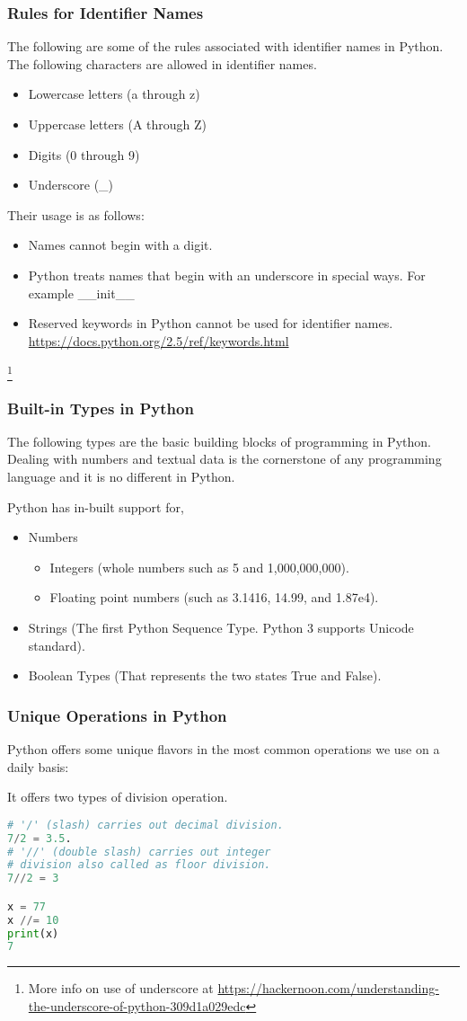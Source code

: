 \documentclass{beamer}
\begin{document}
\begin{frame}[fragile]
\frametitle{Rules for Identifier Names}
The following are some of the rules associated with identifier names in Python.
The following characters are allowed in identifier names.
\begin{itemize}
\item Lowercase letters (a through z)
\item Uppercase letters (A through Z)
\item Digits (0 through 9)
\item Underscore (\_)
\end{itemize}
Their usage is as follows:
\begin{itemize}
\item Names cannot begin with a digit.
\item Python treats names that begin with an underscore in special ways. For example \_\_init\_\_ 
\item Reserved keywords in Python cannot be used for identifier names. \url{https://docs.python.org/2.5/ref/keywords.html}
\end{itemize}
\footnote{More info on use of underscore at \url{https://hackernoon.com/understanding-the-underscore-of-python-309d1a029edc}}
\end{frame}

\begin{frame}
\frametitle{Built-in Types in Python}
The following types are the basic  building blocks of programming in Python. Dealing with numbers and textual data is the cornerstone of any programming language and it is no different in Python.

Python has in-built support for,
\begin{itemize}
\item Numbers
\begin{itemize}
\item Integers (whole numbers such as 5 and 1,000,000,000).
\item Floating point numbers (such as 3.1416, 14.99, and 1.87e4).
\end{itemize}
\item Strings (The first Python Sequence Type. Python 3 supports Unicode standard).
\item Boolean Types (That represents the two states True and False).
\end{itemize}
\end{frame}


\begin{frame}[fragile]
\frametitle{Unique Operations in Python}
Python offers some unique flavors in the most common operations we use on a daily basis:

It offers two types of division operation.
\begin{lstlisting}[language=Python]
# '/' (slash) carries out decimal division.
7/2 = 3.5.
# '//' (double slash) carries out integer
# division also called as floor division.
7//2 = 3

x = 77
x //= 10
print(x)
7
\end{lstlisting}
\end{frame}
\end{document}
